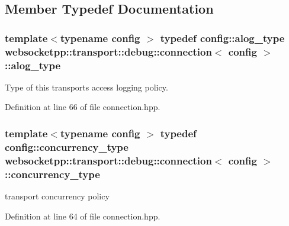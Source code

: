 \subsection{Member Typedef Documentation}
\hypertarget{classwebsocketpp_1_1transport_1_1debug_1_1connection_a4041875e69d6a33ed4f27055fd9d6409}{}
\subsubsection[{alog\+\_\+type}]{\setlength{\rightskip}{0pt plus 5cm}template$<$typename config $>$ typedef config\+::alog\+\_\+type {\bf websocketpp\+::transport\+::debug\+::connection}$<$ config $>$\+::{\bf alog\+\_\+type}}\label{classwebsocketpp_1_1transport_1_1debug_1_1connection_a4041875e69d6a33ed4f27055fd9d6409}


Type of this transport\textquotesingle{}s access logging policy. 



Definition at line 66 of file connection.\+hpp.

\hypertarget{classwebsocketpp_1_1transport_1_1debug_1_1connection_ae42b4d8fcad5351005adbaaee072daec}{}
\subsubsection[{concurrency\+\_\+type}]{\setlength{\rightskip}{0pt plus 5cm}template$<$typename config $>$ typedef config\+::concurrency\+\_\+type {\bf websocketpp\+::transport\+::debug\+::connection}$<$ config $>$\+::{\bf concurrency\+\_\+type}}\label{classwebsocketpp_1_1transport_1_1debug_1_1connection_ae42b4d8fcad5351005adbaaee072daec}


transport concurrency policy 



Definition at line 64 of file connection.\+hpp.

\hypertarget{classwebsocketpp_1_1transport_1_1debug_1_1connection_a38501811c59ca185f0dde7fa7fa8486f}{}
